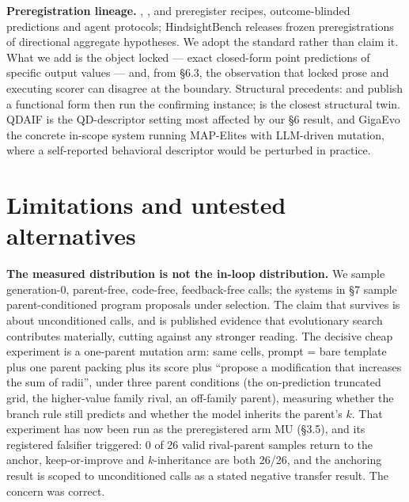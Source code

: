 \textbf{Preregistration lineage.} \citet{thomas2026mitigatingllmbasedphackingpreregistering}, \citet{williams2026predictingllmsafetyrelease}, \citet{vaccaro2026preregistrationexperimentsaiagents} and \citet{zhang2026testingfrontierlargelanguage} preregister
recipes, outcome-blinded predictions and agent protocols; HindsightBench \citep{jia2026hindsightbenchblackboxbehavioralaudit} releases
frozen preregistrations of directional aggregate hypotheses. We adopt the standard rather than
claim it. What we add is the object locked --- exact closed-form point predictions of specific
output values --- and, from \S6.3, the observation that locked prose and executing scorer can
disagree at the boundary. Structural precedents: \citet{kaplan2020scalinglawsneurallanguage} and \citet{hoffmann2022trainingcomputeoptimallargelanguage} publish a functional
form then run the confirming instance; \citet{snell2024predictingemergentcapabilitiesfinetuning} is the closest structural twin. QDAIF
\citep{bradley2023qualitydiversityaifeedback} is the QD-descriptor setting most affected by our \S6 result, and GigaEvo
\citep{khrulkov2025gigaevoopensourceoptimization} the concrete in-scope system running MAP-Elites with LLM-driven mutation, where a
self-reported behavioral descriptor would be perturbed in practice.

\section{Limitations and untested alternatives}

\textbf{The measured distribution is not the in-loop distribution.} We sample generation-0,
parent-free, code-free, feedback-free calls; the systems in \S7 sample parent-conditioned program
proposals under selection. The claim that survives is about unconditioned calls, and \citet{zhang2024understandingimportanceevolutionarysearch}
is published evidence that evolutionary search contributes materially, cutting against any
stronger reading. The decisive cheap experiment is a one-parent mutation arm: same cells,
prompt = bare template plus one parent packing plus its score plus ``propose a modification that
increases the sum of radii'', under three parent conditions (the on-prediction truncated grid,
the higher-value family rival, an off-family parent), measuring whether the branch rule still
predicts and whether the model inherits the parent's $k$. That experiment has now been run as
the preregistered arm MU (\S3.5), and its registered falsifier triggered: 0 of 26 valid
rival-parent samples return to the anchor, keep-or-improve and $k$-inheritance are both 26/26,
and the anchoring result is scoped to unconditioned calls as a stated negative transfer
result. The concern was correct.

